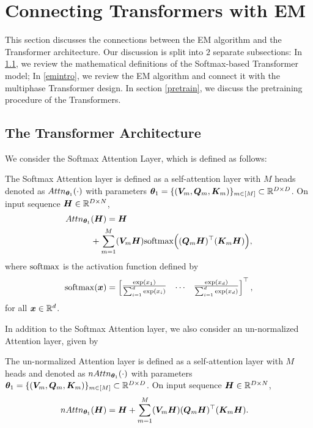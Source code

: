 \section{Connecting Transformers with EM}\label{sect2}
This section discusses the connections between the EM algorithm and the Transformer architecture. 
Our discussion is split into $2$ separate subsections: In \ref{Transformers}, we review the mathematical definitions of the Softmax-based Transformer model; In \ref{emintro}, we review the EM algorithm and connect it with the multiphase Transformer design. In section \ref{pretrain}, we discuss the pretraining procedure of the Transformers.
\subsection{The Transformer Architecture}\label{Transformers}
We consider the Softmax Attention Layer, which is defined as follows:
\begin{definition}\label{def:attention}
  The Softmax Attention layer is defined as a self-attention layer with $M$ heads denoted as $Attn_{\boldsymbol{\theta}_1}(\cdot)$ with parameters $\boldsymbol{\theta}_1=\{(\boldsymbol{V}_m,\boldsymbol{Q}_m,\boldsymbol{K}_m)\}_{m\in[M]}\subset\mathbb{R}^{D\times D}$. On input sequence $\boldsymbol{H}\in\mathbb{R}^{D\times N}$,
    {\begin{align*}
       Attn_{\boldsymbol{\theta}_1}&(\boldsymbol{H})=
            \boldsymbol{H}\\
            &+\sum_{m=1}^M(\boldsymbol{V}_m\boldsymbol{H})\mathrm{softmax}\Big((\boldsymbol{Q}_m\boldsymbol{H})^\top(\boldsymbol{K}_m\boldsymbol{H})\Big),
    \end{align*}}
    where $\mathrm{softmax}$ is the activation function defined by
    \begin{align*}
        \mathrm{softmax}(\boldsymbol{x}) = \begin{bmatrix}
            \frac{\exp(x_1)}{\sum_{i=1}^d\exp(x_i)}&\ldots&\frac{\exp(x_d)}{\sum_{i=1}^d\exp(x_d)}
        \end{bmatrix}^\top,
    \end{align*}
    for all $\boldsymbol{x}\in\mathbb{R}^d$.
\end{definition}
In addition to the Softmax Attention layer, we also consider an un-normalized Attention layer, given by
\begin{definition}\label{def:mattention}
  The un-normalized Attention layer is defined as a self-attention layer with $M$ heads and denoted as $nAttn_{\boldsymbol{\theta}_1}(\cdot)$ with parameters $\boldsymbol{\theta}_1=\{(\boldsymbol{V}_m,\boldsymbol{Q}_m,\boldsymbol{K}_m)\}_{m\in[M]}\subset\mathbb{R}^{D\times D}$. On input sequence $\boldsymbol{H}\in\mathbb{R}^{D\times N}$,
    {\begin{align*}
       nAttn_{\boldsymbol{\theta}_1}&(\boldsymbol{H})=
            \boldsymbol{H}+\sum_{m=1}^M(\boldsymbol{V}_m\boldsymbol{H})(\boldsymbol{Q}_m\boldsymbol{H})^\top(\boldsymbol{K}_m\boldsymbol{H}).
    \end{align*}}
\end{definition}
